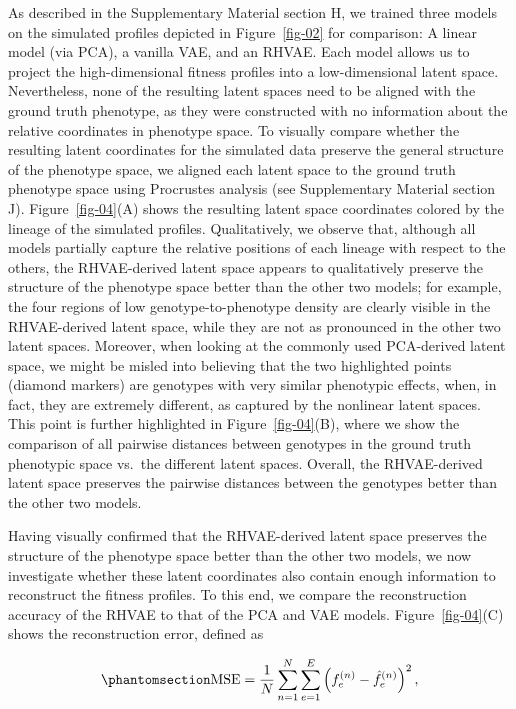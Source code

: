 \documentclass[
]{scrartcl}
\begin{document}
\begin{refsegment}
As described in the Supplementary Material section H, we trained three
models on the simulated profiles depicted in Figure~\ref{fig-02} for
comparison: A linear model (via PCA), a vanilla VAE, and an RHVAE. Each
model allows us to project the high-dimensional fitness profiles into a
low-dimensional latent space. Nevertheless, none of the resulting latent
spaces need to be aligned with the ground truth phenotype, as they were
constructed with no information about the relative coordinates in
phenotype space. To visually compare whether the resulting latent
coordinates for the simulated data preserve the general structure of the
phenotype space, we aligned each latent space to the ground truth
phenotype space using Procrustes analysis (see Supplementary Material
section J). Figure~\ref{fig-04}(A) shows the resulting latent space
coordinates colored by the lineage of the simulated profiles.
Qualitatively, we observe that, although all models partially capture
the relative positions of each lineage with respect to the others, the
RHVAE-derived latent space appears to qualitatively preserve the
structure of the phenotype space better than the other two models; for
example, the four regions of low genotype-to-phenotype density are
clearly visible in the RHVAE-derived latent space, while they are not as
pronounced in the other two latent spaces. Moreover, when looking at the
commonly used PCA-derived latent space, we might be misled into
believing that the two highlighted points (diamond markers) are
genotypes with very similar phenotypic effects, when, in fact, they are
extremely different, as captured by the nonlinear latent spaces. This
point is further highlighted in Figure~\ref{fig-04}(B), where we show
the comparison of all pairwise distances between genotypes in the ground
truth phenotypic space vs.~the different latent spaces. Overall, the
RHVAE-derived latent space preserves the pairwise distances between the
genotypes better than the other two models.

Having visually confirmed that the RHVAE-derived latent space preserves
the structure of the phenotype space better than the other two models,
we now investigate whether these latent coordinates also contain enough
information to reconstruct the fitness profiles. To this end, we compare
the reconstruction accuracy of the RHVAE to that of the PCA and VAE
models. Figure~\ref{fig-04}(C) shows the reconstruction error, defined
as

\begin{equation}\phantomsection\label{eq-04-mse}{
\text{MSE} = 
\frac{1}{N} 
\sum_{n=1}^{N} 
\sum_{e=1}^{E} 
\left( f^{(n)}_e - \hat{f}^{(n)}_e \right)^2,
}\end{equation}


\end{refsegment}
\end{document}
